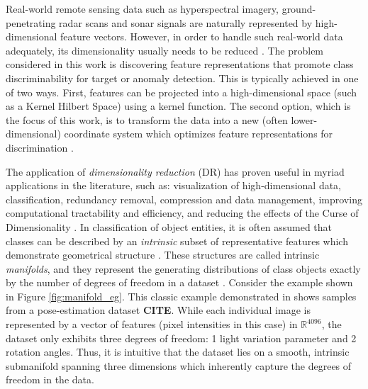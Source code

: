 Real-world remote sensing data such as hyperspectral imagery, ground-penetrating radar scans and sonar signals are naturally represented by high-dimensional feature vectors.  However, in order to handle such real-world data adequately, its dimensionality usually needs to be reduced \citep{VanDerMaaten2009DRReview,Belkin2004SemiSupLearningRiemannianManifolds}. The problem considered in this work is discovering feature representations that promote class discriminability for target or anomaly detection.  This is typically achieved in one of two ways.  First, features can be projected into a high-dimensional space (such as a Kernel Hilbert Space) using a kernel function. The second option, which is the focus of this work, is to transform the data into a new (often lower-dimensional) coordinate system which optimizes feature representations for discrimination \citep{Vural2018StudySupervisedManifoldLearning}.


The application of \textit{dimensionality reduction} (DR) has proven useful in myriad applications in the literature, such as: visualization of high-dimensional data, classification, redundancy removal, compression and data management, improving computational tractability and efficiency, and reducing the effects of the Curse of Dimensionality \citep{Bishop1998GTM,Nickel2017PoincareEmbeddings,Talmon2015ManifoldLearningInDynamicalSystems,Tenenbaum2000Isomap, Geng2005SupNonlinearDimRed, Palomo2017GHNG, Kohonen1990SOM,Kegl2008PrincipalManifoldsTextbook,Bengio2014RepLearningReview}.  In classification of object entities, it is often assumed that classes can be described by an \textit{intrinsic} subset of representative features which demonstrate geometrical structure \citep{Belkin2006ManReg}. These structures are called intrinsic \textit{manifolds}, and they represent the generating distributions of class objects exactly by the number of degrees of freedom in a dataset \citep{Thorstensen2009ManifoldThesis, Belkin2004SemiSupLearningRiemannianManifolds}.     Consider the example shown in Figure \ref{fig:manifold_eg}.  This classic example demonstrated in \citep{Thorstensen2009ManifoldThesis} shows samples from a pose-estimation dataset \textbf{CITE}.  While each individual image is represented by a vector of features (pixel intensities in this case) in $\mathbb{R}^{4096}$, the dataset only exhibits three degrees of freedom: 1 light variation parameter and 2 rotation angles.  Thus, it is intuitive that the dataset lies on a smooth, intrinsic submanifold spanning three dimensions which inherently capture the degrees of freedom in the data.

